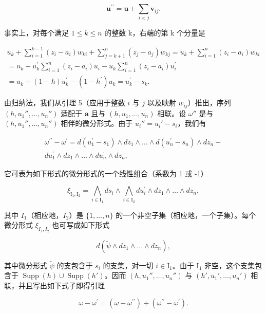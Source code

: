 \[
\boldsymbol {u} ^ {\prime \prime} = \boldsymbol {u} + \sum_ {i <   j} \boldsymbol {v} _ {i j}.
\]

事实上，对每个满足 \(1 \leqslant k \leqslant n\) 的整数 k，右端的第 k 个分量是

\[
\begin{array}{c} u _ {k} + \sum_ {i = 1} ^ {k - 1} (z _ {i} - a _ {i}) w _ {k i} + \sum_ {j = k + 1} ^ {n} (z _ {j} - a _ {j}) w _ {k j} = u _ {k} + \sum_ {i = 1} ^ {n} (z _ {i} - a _ {i}) w _ {k i} \\ = u _ {k} + u _ {k} ^ {\prime} \sum_ {i = 1} ^ {n} (z _ {i} - a _ {i}) u _ {i} - u _ {k} \sum_ {i = 1} ^ {n} (z _ {i} - a _ {i}) u _ {i} ^ {\prime} \\ = u _ {k} + (1 - h) u _ {k} ^ {\prime} - (1 - h ^ {\prime}) u _ {k} = u _ {k} ^ {\prime} - s _ {k}. \end{array}
\]

由归纳法，我们从引理 5（应用于整数 \(i\) 与 \(j\) 以及映射 \(w_{ij}\)）推出，序列 \((h,u_1'',\ldots,u_n'')\) 适配于 \(\boldsymbol{a}\) 且与 \((h,u_1,\ldots,u_n)\) 相联。设 \(\omega''\) 是与 \((h,u_1'',\ldots,u_n'')\) 相伴的微分形式。由于 \(u_i'' = u_i' - s_i\)，我们有

\[
\begin{array}{r} \omega^ {\prime \prime} - \omega^ {\prime} = d (u _ {1} ^ {\prime} - s _ {1}) \wedge d z _ {1} \wedge \dots \wedge d (u _ {n} ^ {\prime} - s _ {n}) \wedge d z _ {n} - \\ d u _ {1} ^ {\prime} \wedge d z _ {1} \wedge \dots \wedge d u _ {n} ^ {\prime} \wedge d z _ {n}, \end{array}
\]

它可表为如下形式的微分形式的一个线性组合（系数为 1 或 -1）

\[
\xi_ {\mathrm{I} _ {1}, \mathrm{I} _ {2}} = \bigwedge_ {i \in \mathrm{I} _ {1}} d s _ {i} \wedge \bigwedge_ {i \in \mathrm{I} _ {2}} d u _ {i} ^ {\prime} \wedge d z _ {1} \wedge \dots \wedge d z _ {n},
\]

其中 \(I_{1}\)（相应地，\(I_{2}\)）是 \(\{1,\ldots,n\}\) 的一个非空子集（相应地，一个子集）。每个微分形式 \(\xi_{I_{1},I_{2}}\) 也可写成如下形式

\[
d (\widetilde {\psi} \wedge d z _ {1} \wedge \dots \wedge d z _ {n}),
\]

其中微分形式 \(\widetilde{\psi}\) 的支包含于 \(s_i\) 的支集，对一切 \(i \in \mathrm{I}_1\)。由于 \(\mathrm{I}_1\) 非空，这个支集包含于 \(\operatorname{Supp}(h) \cup \operatorname{Supp}(h')\)。因而 \((h, u_1'', \ldots, u_n'')\) 与 \((h', u_1', \ldots, u_n')\) 相联，并且写出如下式子即得引理

\[
\omega - \omega^ {\prime} = (\omega - \omega^ {\prime \prime}) + (\omega^ {\prime \prime} - \omega^ {\prime}).
\]

